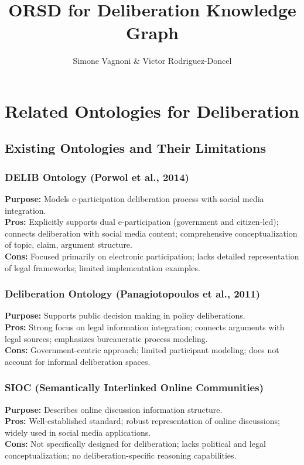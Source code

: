 \documentclass{article}
\begin{document}
\title{ORSD for Deliberation Knowledge Graph}
\author{Simone Vagnoni & Victor Rodriguez-Doncel}
\maketitle

\section{Related Ontologies for Deliberation}

\subsection{Existing Ontologies and Their Limitations}

\subsubsection{DELIB Ontology (Porwol et al., 2014)}
\textbf{Purpose:} Models e-participation deliberation process with social media integration.\\
\textbf{Pros:} Explicitly supports dual e-participation (government and citizen-led); connects deliberation with social media content; comprehensive conceptualization of topic, claim, argument structure.\\
\textbf{Cons:} Focused primarily on electronic participation; lacks detailed representation of legal frameworks; limited implementation examples.

\subsubsection{Deliberation Ontology (Panagiotopoulos et al., 2011)}
\textbf{Purpose:} Supports public decision making in policy deliberations.\\
\textbf{Pros:} Strong focus on legal information integration; connects arguments with legal sources; emphasizes bureaucratic process modeling.\\
\textbf{Cons:} Government-centric approach; limited participant modeling; does not account for informal deliberation spaces.

\subsubsection{SIOC (Semantically Interlinked Online Communities)}
\textbf{Purpose:} Describes online discussion information structure.\\
\textbf{Pros:} Well-established standard; robust representation of online discussions; widely used in social media applications.\\
\textbf{Cons:} Not specifically designed for deliberation; lacks political and legal conceptualization; no deliberation-specific reasoning capabilities.
\end{document}
